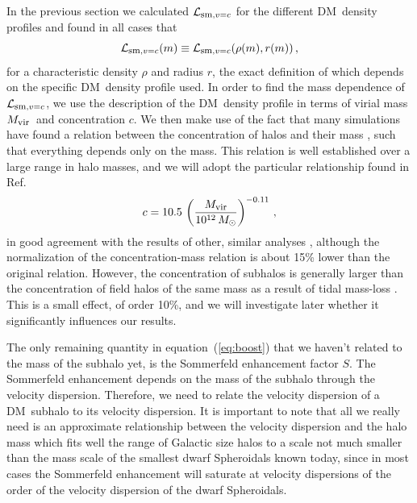 \documentclass[aps,prd,twocolumn,amsmath,amssymb,floatfix,nofootinbib,10pt]{revtex4}
\newcommand{\DM}{DM}
\newcommand{\somm}{\ensuremath{S}}
\newcommand{\eqnname}{equation}
\newcommand{\lum}{\ensuremath{\mathcal{L}}}
\newcommand{\lumsmoothc}{\ensuremath{\lum_{\mbox{{\footnotesize sm}},v=c}}}
\newcommand{\Msol}{\ensuremath{M_{\odot}}}
\newcommand{\Mvir}{\ensuremath{M_{\mbox{{\footnotesize vir}}}}}
\newcommand{\conc}{\ensuremath{c}}
\begin{document}
In the previous section we calculated $\lumsmoothc$ for the different
\DM\ density profiles and found in all cases that
\begin{equation}
\lumsmoothc(m) \equiv \lumsmoothc(\rho(m),r(m))\, ,
\end{equation}
for a characteristic density $\rho$ and radius $r$, the exact
definition of which depends on the specific \DM\ density profile
used. In order to find the mass dependence of $\lumsmoothc$, we use
the description of the \DM\ density profile in terms of virial mass
\Mvir\ and concentration \conc. We then make use of the fact that many
simulations have found a relation between the concentration of halos
and their mass
\cite{2001MNRAS.321..559B,2001ApJ...554..114E,2008MNRAS.387..536G,2007MNRAS.381.1450N},
such that everything depends only on the mass. This relation is well
established over a large range in halo masses, and we will adopt the
particular relationship found in Ref.~\cite{2007MNRAS.378...55M}
\begin{equation}\label{eq:concscaling}
\conc = 10.5 \, \left(\frac{\Mvir}{10^{12}\, \Msol}\right)^{-0.11}\, ,
\end{equation}
in good agreement with the results of other, similar analyses
\cite{2001MNRAS.321..559B,2005MNRAS.357..387K}, although the
normalization of the concentration-mass relation is about 15\% lower
than the original relation. However, the concentration of subhalos is
generally larger than the concentration of field halos of the same
mass as a result of tidal mass-loss
\cite{1998MNRAS.300..146G,2008ApJ...673..226P,2004MNRAS.355..794H,2005ApJ...635..931B,2004ApJ...608..663K}. This
is a small effect, of order 10\%, and we will investigate later
whether it significantly influences our results.

The only remaining quantity in \eqnname\ (\ref{eq:boost}) that we
haven't related to the mass of the subhalo yet, is the Sommerfeld
enhancement factor \somm. The Sommerfeld enhancement depends on the
mass of the subhalo through the velocity dispersion. Therefore, we
need to relate the velocity dispersion of a \DM\ subhalo to its
velocity dispersion. It is important to note that all we really need
is an approximate relationship between the velocity dispersion and the
halo mass which fits well the range of Galactic size halos to a scale
not much smaller than the mass scale of the smallest dwarf Spheroidals
known today, since in most cases the Sommerfeld enhancement will
saturate at velocity dispersions of the order of the velocity
dispersion of the dwarf Spheroidals.
\end{document}
